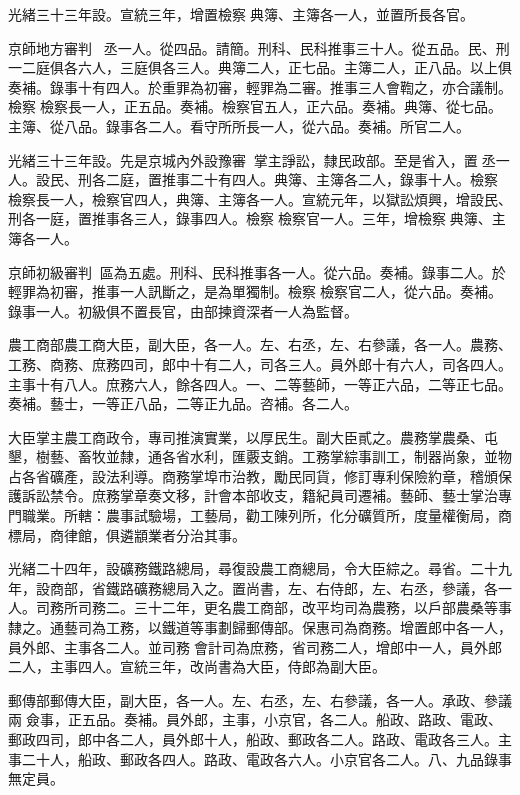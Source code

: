 \begin{pinyinscope}
光緒三十三年設。宣統三年，增置檢察典簿、主簿各一人，並置所長各官。

京師地方審判，丞一人。從四品。請簡。刑科、民科推事三十人。從五品。民、刑一二庭俱各六人，三庭俱各三人。典簿二人，正七品。主簿二人，正八品。以上俱奏補。錄事十有四人。於重罪為初審，輕罪為二審。推事三人會鞫之，亦合議制。檢察檢察長一人，正五品。奏補。檢察官五人，正六品。奏補。典簿、從七品。主簿、從八品。錄事各二人。看守所所長一人，從六品。奏補。所官二人。

光緒三十三年設。先是京城內外設豫審，掌主諍訟，隸民政部。至是省入，置丞一人。設民、刑各二庭，置推事二十有四人。典簿、主簿各二人，錄事十人。檢察檢察長一人，檢察官四人，典簿、主簿各一人。宣統元年，以獄訟煩興，增設民、刑各一庭，置推事各三人，錄事四人。檢察檢察官一人。三年，增檢察典簿、主簿各一人。

京師初級審判，區為五處。刑科、民科推事各一人。從六品。奏補。錄事二人。於輕罪為初審，推事一人訊斷之，是為單獨制。檢察檢察官二人，從六品。奏補。錄事一人。初級俱不置長官，由部揀資深者一人為監督。

農工商部農工商大臣，副大臣，各一人。左、右丞，左、右參議，各一人。農務、工務、商務、庶務四司，郎中十有二人，司各三人。員外郎十有六人，司各四人。主事十有八人。庶務六人，餘各四人。一、二等藝師，一等正六品，二等正七品。奏補。藝士，一等正八品，二等正九品。咨補。各二人。

大臣掌主農工商政令，專司推演實業，以厚民生。副大臣貳之。農務掌農桑、屯墾，樹藝、畜牧並隸，通各省水利，匯覈支銷。工務掌綜事訓工，制器尚象，並物占各省礦產，設法利導。商務掌埠市治教，勵民同貨，修訂專利保險約章，稽頒保護訴訟禁令。庶務掌章奏文移，計會本部收支，籍紀員司遷補。藝師、藝士掌治專門職業。所轄：農事試驗場，工藝局，勸工陳列所，化分礦質所，度量權衡局，商標局，商律館，俱遴顓業者分治其事。

光緒二十四年，設礦務鐵路總局，尋復設農工商總局，令大臣綜之。尋省。二十九年，設商部，省鐵路礦務總局入之。置尚書，左、右侍郎，左、右丞，參議，各一人。司務所司務二。三十二年，更名農工商部，改平均司為農務，以戶部農桑等事隸之。通藝司為工務，以鐵道等事劃歸郵傳部。保惠司為商務。增置郎中各一人，員外郎、主事各二人。並司務會計司為庶務，省司務二人，增郎中一人，員外郎二人，主事四人。宣統三年，改尚書為大臣，侍郎為副大臣。

郵傳部郵傳大臣，副大臣，各一人。左、右丞，左、右參議，各一人。承政、參議兩僉事，正五品。奏補。員外郎，主事，小京官，各二人。船政、路政、電政、郵政四司，郎中各二人，員外郎十人，船政、郵政各二人。路政、電政各三人。主事二十人，船政、郵政各四人。路政、電政各六人。小京官各二人。八、九品錄事無定員。


\end{pinyinscope}
